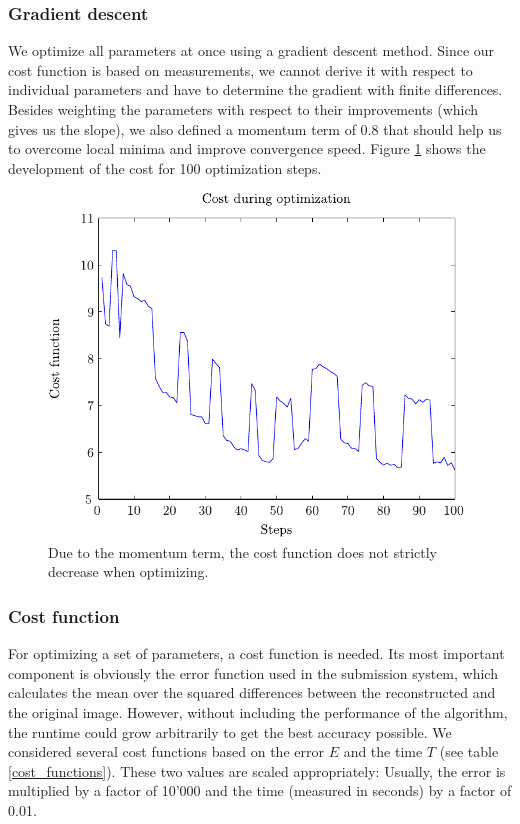 \documentclass[10pt,conference,compsocconf]{IEEEtran}
\begin{document}
\subsubsection{Gradient descent}
\label{gradient_descent}
We optimize all parameters at once using a gradient descent method. Since our cost function is based on measurements, we cannot derive it with respect to individual parameters and have to determine the gradient with finite differences. Besides weighting the parameters with respect to their improvements (which gives us the slope), we also defined a momentum term of 0.8 that should help us to overcome local minima and improve convergence speed. Figure \ref{gradient_descent_cost} shows the development of the cost for 100 optimization steps.

\begin{figure}
\centering
\includegraphics[width=0.8\columnwidth]{../plots/cost_plot.pdf}
\caption{Due to the momentum term, the cost function does not strictly decrease when optimizing.}
\label{gradient_descent_cost}
\end{figure}

\subsubsection{Cost function}
For optimizing a set of parameters, a cost function is needed. Its most important component is obviously the error function used in the submission system, which calculates the mean over the squared differences between the reconstructed and the original image. However, without including the performance of the algorithm, the runtime could grow arbitrarily to get the best accuracy possible. We considered several cost functions based on the error $E$ and the time $T$ (see table \ref{cost_functions}). These two values are scaled appropriately: Usually, the error is multiplied by a factor of 10'000 and the time (measured in seconds) by a factor of 0.01.
\end{document}
